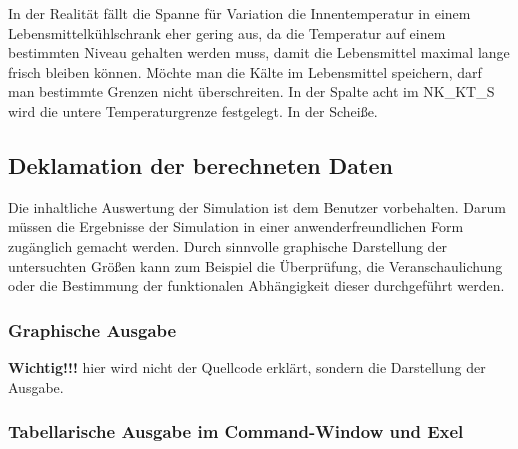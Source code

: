 \begin{description}
In der Realität fällt die Spanne für Variation die Innentemperatur in einem Lebensmittelkühlschrank eher gering aus, da die
Temperatur auf einem bestimmten Niveau gehalten werden muss, damit die Lebensmittel maximal lange frisch bleiben können.
Möchte man die Kälte im Lebensmittel speichern, darf man bestimmte Grenzen nicht überschreiten. In der Spalte acht im
NK\_KT\_S wird die untere Temperaturgrenze festgelegt. In der Scheiße.

\end{description}
\subsection{Deklamation der berechneten Daten}

Die inhaltliche Auswertung der Simulation ist dem Benutzer vorbehalten. Darum müssen die Ergebnisse der Simulation in einer
anwenderfreundlichen Form zugänglich gemacht werden. Durch sinnvolle graphische Darstellung der untersuchten Größen kann zum
Beispiel die Überprüfung, die Veranschaulichung oder die Bestimmung der funktionalen Abhängigkeit dieser durchgeführt werden.


\subsubsection{Graphische Ausgabe}
\textbf{Wichtig!!!} hier wird nicht der Quellcode erklärt, sondern die Darstellung der Ausgabe.
\subsubsection{Tabellarische Ausgabe im Command-Window und Exel}

